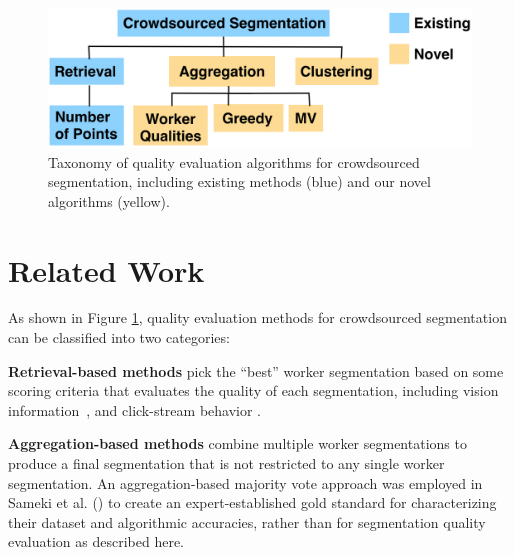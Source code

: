 \documentclass[letterpaper]{article}
\newcommand{\stitle}[1]{\noindent \textbf{#1}}
\begin{document}
\begin{figure}
\centering
\includegraphics[width=0.75\linewidth]{plots/flowchart.png}
\caption{Taxonomy of quality evaluation algorithms for crowdsourced segmentation, including existing methods (blue) and our novel algorithms (yellow).
} %
\label{flowchart}
\end{figure}
\section{Related Work\label{sec:related}}
As shown in Figure \ref{flowchart}, quality evaluation methods for crowdsourced segmentation can be classified into two categories:

\stitle{Retrieval-based methods} pick the ``best'' worker segmentation based on some scoring criteria that evaluates the quality of each segmentation, including vision information~\cite{Vittayakorn2011,Russakovsky2015}, and click-stream behavior \cite{Cabezas2015,Sameki2015,Sorokin2008}.%

\stitle{Aggregation-based methods} combine multiple worker segmentations to produce a final segmentation that is not restricted to any single worker segmentation. An aggregation-based majority vote approach was employed in Sameki et al. (\citeyear{Sameki2015}) to create an expert-established gold standard for characterizing their dataset and algorithmic accuracies, rather than for segmentation quality evaluation as described here.
\end{document}
